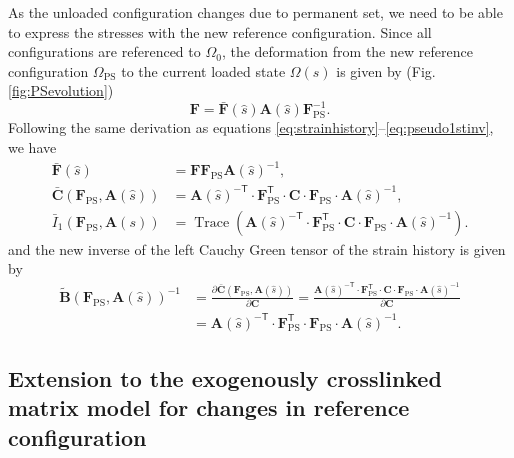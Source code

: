 As the unloaded configuration changes due to permanent set, we need to be able to express the stresses with the new reference configuration. Since all configurations are referenced to $\Omega_0$, the deformation from the new reference configuration $\Omega_\mathrm{PS}$ to the current loaded state $\Omega(s)$ is given by (Fig. \ref{fig:PSevolution})
\begin{equation}
\mathbf{F} = \mathbf{\bar{F}}(\hat{s})\mathbf{A}(\hat{s})\mathbf{F}_\mathrm{PS}^{-1}.
\end{equation}
Following the same derivation as  equations \ref{eq:strainhistory}--\ref{eq:pseudo1stinv}, we have
\begin{equation} \label{eq:newhistory}
\begin{split}
\mathbf{\bar{F}}(\hat{s}) &= \mathbf{F}\mathbf{F}_\mathrm{PS}\mathbf{A}(\hat{s})^{-1},\\
\mathbf{\bar{C}}(\mathbf{F}_\mathrm{PS}, \mathbf{A}(\hat{s})) &= \mathbf{A}(\hat{s})^{-\mathsf{T}} \cdot \mathbf{F}_\mathrm{PS}^\mathsf{T} \cdot \mathbf{C} \cdot \mathbf{F}_\mathrm{PS} \cdot \mathbf{A}(\hat{s})^{-1}, \\
\bar{I}_1\left(\mathbf{F}_\mathrm{PS}, \mathbf{A}(s)\right) &= \operatorname{Trace}\left(\mathbf{A}(\hat{s})^{-\mathsf{T}} \cdot \mathbf{F}_\mathrm{PS}^\mathsf{T} \cdot \mathbf{C} \cdot \mathbf{F}_\mathrm{PS} \cdot \mathbf{A}(\hat{s})^{-1}\right). 
\end{split}
\end{equation}
and the new inverse of the left Cauchy Green tensor of the strain history is given by
\begin{equation}
\begin{split}
\mathbf{\tilde{B}}(\mathbf{F}_\mathrm{PS}, \mathbf{A}(\hat{s}))^{-1} &= \frac{\partial \mathbf{\bar{C}}(\mathbf{F}_\mathrm{PS}, \mathbf{A}(\hat{s}))}{\partial \mathbf{C}} = \frac{\mathbf{A}(\hat{s})^{-\mathsf{T}} \cdot \mathbf{F}_\mathrm{PS}^\mathsf{T} \cdot \mathbf{C} \cdot \mathbf{F}_\mathrm{PS} \cdot \mathbf{A}(\hat{s})^{-1}}{\partial \mathbf{C}} \\
 &= \mathbf{A}(\hat{s})^{-\mathsf{T}} \cdot \mathbf{F}_\mathrm{PS}^\mathsf{T} \cdot \mathbf{F}_\mathrm{PS} \cdot \mathbf{A}(\hat{s})^{-1}. 
\end{split}
\end{equation}


\subsection{Extension to the exogenously crosslinked matrix model for changes in reference configuration}


